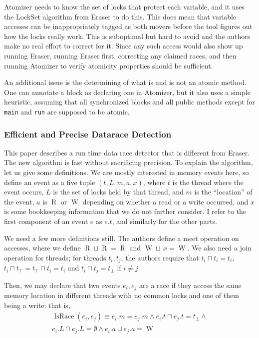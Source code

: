 \documentclass{article}
\DeclareMathOperator{\READ}{R}
\DeclareMathOperator{\WRITE}{W}
\DeclareMathOperator{\IsRace}{IsRace}
\begin{document}
\begin{multicols}{2}
Atomizer needs to know the set of locks that protect each variable,
and it uses the LockSet algorithm from Eraser to do this.  This does
mean that variable accesses can be inappropriately tagged as both
movers before the tool figures out how the locks really work.  This is
suboptimal but hard to avoid and the authors make no real effort to
correct for it.  Since any such access would also show up running
Eraser, running Eraser first, correcting any claimed races, and then
running Atomizer to verify atomicity properties should be sufficient.

An additional issue is the determining of what is and is not an atomic
method.  One can annotate a block as declaring one in Atomizer, but it
also uses a simple heuristic, assuming that all synchronized blocks
and all public methods except for \texttt{main} and \texttt{run} are
supposed to be atomic.

\subsubsection{Efficient and Precise Datarace Detection~\cite{512560}}

This paper describes a run time data race detector that is different
from Eraser.  The new algorithm is fast without sacrificing precision.
To explain the algorithm, let us give some definitions.  We are mostly
interested in memory events here, so define an event as a five tuple
$(t, L, m, a, x)$, where $t$ is the thread where the event occurs, $L$
is the set of locks held by that thread, and $m$ is the ``location''
of the event, $a$ is $\READ$ or $\WRITE$ depending on whether a read
or a write occurred, and $x$ is some bookkeeping information that we
do not further consider.  I refer to the first component of an event
$e$ as $e.t$, and similarly for the other parts.

We need a few more definitions still.  The authors define a meet
operation on accesses, where we define $\READ \sqcup \READ = \READ$
and $\WRITE \sqcup \, x = \WRITE$.  We also need a join operation for
threads; for threads $t_i, t_j$, the authors require that $t_i \sqcap
t_i = t_i$, $t_i \sqcap t_\top = t_\top \sqcap t_i = t_i$ and $t_i
\sqcap t_j = t_\bot$ if $i \neq j$.

Then, we may declare that two events $e_i, e_j$ are a race if they
access the same memory location in different threads with no common
locks and one of them being a write: that is,
\begin{multline*}
\IsRace(e_i, e_j) \equiv e_i.m =
e_j.m \wedge e_i.t \sqcap e_j.t = t_\bot \wedge \\ e_i.L \cap e_j.L = \emptyset
\wedge e_i.a \sqcup e_j.a = \WRITE
\end{multline*}


\end{multicols}
\end{document}
